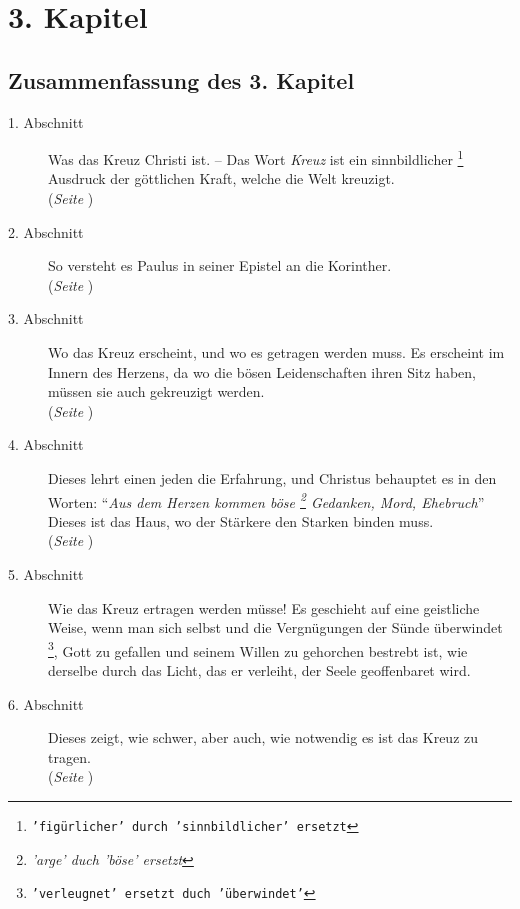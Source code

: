 

\chapter{3. Kapitel} \label{kap3}

\section{Zusammenfassung des 3. Kapitel}


\begin{description}
\item[1. Abschnitt] Was das Kreuz Christi ist. -- Das Wort \textit{Kreuz} ist ein
sinnbildlicher
\footnote{\texttt{'figürlicher' durch 'sinnbildlicher' ersetzt}}
Ausdruck der göttlichen Kraft, welche die Welt kreuzigt.
\\(\textit{Seite \pageref{kap3_ab1}})
\item[2. Abschnitt] So versteht es Paulus in seiner Epistel an die
Korinther.
\\(\textit{Seite \pageref{kap3_ab2}})
\item[3. Abschnitt] Wo das Kreuz erscheint, und wo es getragen werden muss. Es
erscheint im Innern des Herzens, da wo die bösen Leidenschaften ihren Sitz haben,
müssen sie auch gekreuzigt werden.
\\(\textit{Seite \pageref{kap3_ab3}})
\item[4. Abschnitt] Dieses lehrt einen jeden
die Erfahrung, und Christus
behauptet es in den Worten: "`\textit{Aus dem Herzen kommen böse
\footnote{\textit{'arge' duch 'böse' ersetzt}} Gedanken, Mord,
Ehebruch}"' Dieses ist das Haus, wo der Stärkere den Starken binden muss.
\\(\textit{Seite \pageref{kap3_ab4}})
\item[5. Abschnitt] Wie das Kreuz ertragen werden müsse! Es geschieht auf eine
geistliche Weise, wenn man sich selbst und die Vergnügungen der Sünde überwindet
\footnote{\texttt{'verleugnet' ersetzt duch 'überwindet'}}, Gott zu gefallen und
seinem Willen zu gehorchen bestrebt ist, wie
derselbe durch das Licht, das er verleiht, der Seele geoffenbaret wird.
\item[6. Abschnitt] Dieses zeigt, wie schwer, aber auch, wie notwendig es ist
das Kreuz zu tragen.
\\(\textit{Seite \pageref{kap3_ab5}})
\end{description}

\newpage

